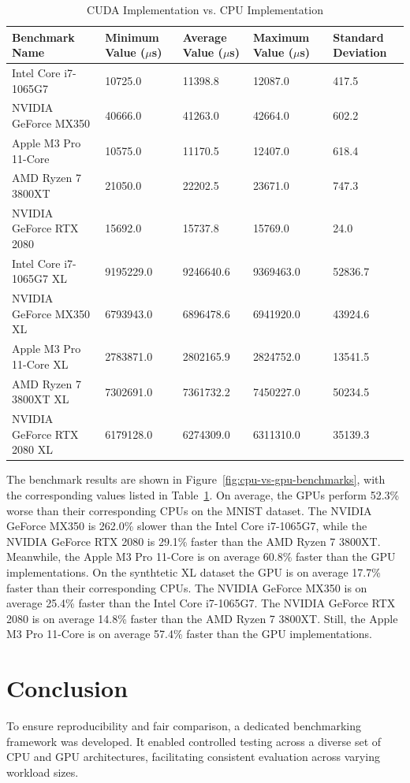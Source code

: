 \documentclass[modern,longauthor]{aastex7}
\begin{document}
\begin{table}[htb!]
\centering
\caption{CUDA Implementation vs. CPU Implementation\label{tab:cpu-vs-gpu-benchmarks}}
\begin{tabular}{p{5.5cm} p{2cm} p{2cm} p{2cm} p{2cm}}
\hline
Benchmark Name & Minimum Value ($\mu$s) & Average Value ($\mu$s) & Maximum Value ($\mu$s) & Standard Deviation \\
\hline
Intel Core i7-1065G7 & 10725.0 & 11398.8 & 12087.0 & 417.5 \\
NVIDIA GeForce MX350 & 40666.0 & 41263.0 & 42664.0 & 602.2 \\
Apple M3 Pro 11-Core & 10575.0 & 11170.5 & 12407.0 & 618.4 \\
AMD Ryzen 7 3800XT & 21050.0 & 22202.5 & 23671.0 & 747.3 \\
NVIDIA GeForce RTX 2080 & 15692.0 & 15737.8 & 15769.0 & 24.0 \\
\hline
Intel Core i7-1065G7 XL & 9195229.0 & 9246640.6 & 9369463.0 & 52836.7 \\
NVIDIA GeForce MX350 XL & 6793943.0 & 6896478.6 & 6941920.0 & 43924.6 \\
Apple M3 Pro 11-Core XL & 2783871.0 & 2802165.9 & 2824752.0 & 13541.5 \\
AMD Ryzen 7 3800XT XL & 7302691.0 & 7361732.2 & 7450227.0 & 50234.5 \\
NVIDIA GeForce RTX 2080 XL & 6179128.0 & 6274309.0 & 6311310.0 & 35139.3 \\
\hline
\end{tabular}
\end{table}
\FloatBarrier

The benchmark results are shown in Figure~\ref{fig:cpu-vs-gpu-benchmarks}, with the corresponding values listed in Table~\ref{tab:cpu-vs-gpu-benchmarks}. On average, the GPUs perform 52.3\% worse than their corresponding CPUs on the MNIST dataset. The NVIDIA GeForce MX350 is 262.0\% slower than the Intel Core i7-1065G7, while the NVIDIA GeForce RTX 2080 is 29.1\% faster than the AMD Ryzen 7 3800XT. Meanwhile, the Apple M3 Pro 11-Core is on average 60.8\% faster than the GPU implementations. On the synthtetic XL dataset the GPU is on average 17.7\% faster than their corresponding CPUs. The NVIDIA GeForce MX350 is on average 25.4\% faster than the Intel Core i7-1065G7. The NVIDIA GeForce RTX 2080 is on average 14.8\% faster than the AMD Ryzen 7 3800XT. Still, the Apple M3 Pro 11-Core is on average 57.4\% faster than the GPU implementations.
\section{Conclusion}\label{sec:conclusion}
To ensure reproducibility and fair comparison, a dedicated benchmarking framework was developed. It enabled controlled testing across a diverse set of CPU and GPU architectures, facilitating consistent evaluation across varying workload sizes.
\end{document}
